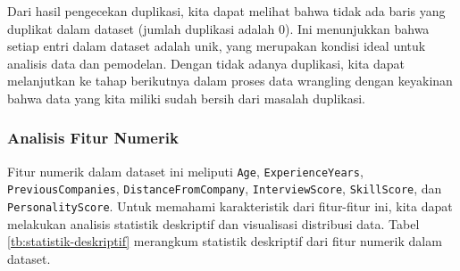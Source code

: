 Dari hasil pengecekan duplikasi, kita dapat melihat bahwa tidak ada baris yang duplikat dalam dataset (jumlah duplikasi adalah 0). Ini menunjukkan bahwa setiap entri dalam dataset adalah unik, yang merupakan kondisi ideal untuk analisis data dan pemodelan. Dengan tidak adanya duplikasi, kita dapat melanjutkan ke tahap berikutnya dalam proses data wrangling dengan keyakinan bahwa data yang kita miliki sudah bersih dari masalah duplikasi.

\subsubsection{Analisis Fitur Numerik}
Fitur numerik dalam dataset ini meliputi \texttt{Age}, \texttt{ExperienceYears}, \texttt{PreviousCompanies}, \texttt{DistanceFromCompany}, \texttt{InterviewScore}, \texttt{SkillScore}, dan \texttt{PersonalityScore}. Untuk memahami karakteristik dari fitur-fitur ini, kita dapat melakukan analisis statistik deskriptif dan visualisasi distribusi data. Tabel \ref{tb:statistik-deskriptif} merangkum statistik deskriptif dari fitur numerik dalam dataset.



